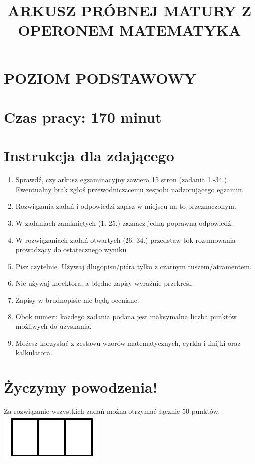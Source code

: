 \documentclass[10pt]{article}
\title{ARKUSZ PRÓBNEJ MATURY Z OPERONEM MATEMATYKA }
\author{}
\date{}
\begin{document}
\maketitle
\section*{POZIOM PODSTAWOWY}
\section*{Czas pracy: 170 minut}
\section*{Instrukcja dla zdającego}
\begin{enumerate}
  \item Sprawdź, czy arkusz egzaminacyjny zawiera 15 stron (zadania 1.-34.). Ewentualny brak zgłoś przewodniczącemu zespołu nadzorującego egzamin.
  \item Rozwiązania zadań i odpowiedzi zapisz w miejscu na to przeznaczonym.
  \item W zadaniach zamkniętych (1.-25.) zaznacz jedną poprawną odpowiedź.
  \item W rozwiązaniach zadań otwartych (26.-34.) przedstaw tok rozumowania prowadzący do ostatecznego wyniku.
  \item Pisz czytelnie. Używaj długopisu/pióra tylko z czarnym tuszem/atramentem.
  \item Nie używaj korektora, a błędne zapisy wyraźnie przekreśl.
  \item Zapisy w brudnopisie nie będą oceniane.
  \item Obok numeru każdego zadania podana jest maksymalna liczba punktów możliwych do uzyskania.
  \item Możesz korzystać z zestawu wzorów matematycznych, cyrkla i linijki oraz kalkulatora.
\end{enumerate}

\section*{Życzymy powodzenia!}
Za rozwiązanie wszystkich zadań można otrzymać łącznie 50 punktów.\\
\includegraphics[max width=\textwidth, center]{2024_11_21_6574e892c2387ce90f12g-01(1)}
\end{document}
